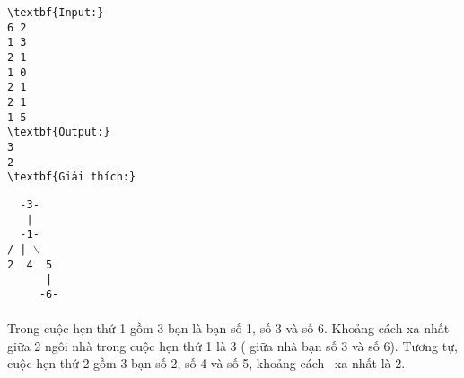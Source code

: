 \begin{verbatim}
\textbf{Input:}
6 2
1 3
2 1
1 0
2 1
2 1
1 5
\textbf{Output:}
3
2
\textbf{Giải thích:}\end{verbatim}


\texttt{  -3-
\\   |
\\  -1-
\\/ | $\backslash$
\\2  4  5
\\      |
\\     -6-}
\\
\\​Trong cuộc hẹn thứ 1 gồm 3 bạn là bạn số 1, số 3 và số 6. Khoảng cách xa nhất giữa 2 ngôi nhà trong cuộc hẹn thứ 1 là 3 ( giữa nhà bạn số 3 và số 6). Tương tự, cuộc hẹn thứ 2 gồm 3 bạn số 2, số 4 và số 5, khoảng cách  xa nhất là 2.
